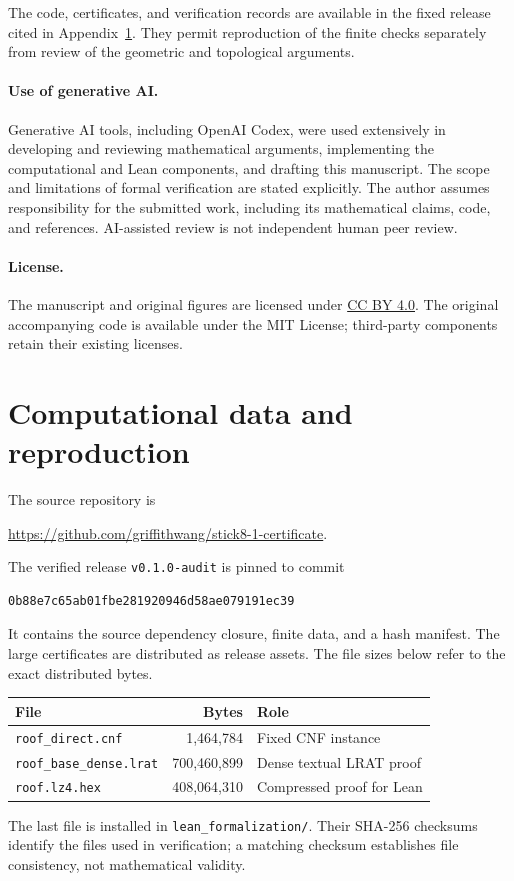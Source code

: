 \documentclass[11pt]{article}
\newcommand{\code}[1]{\nolinkurl{#1}}
\begin{document}
The code, certificates, and verification records are available in the
fixed release cited in Appendix~\ref{app:reproduction}. They permit
reproduction of the finite checks separately from review of the
geometric and topological arguments.

\paragraph{Use of generative AI.}
Generative AI tools, including OpenAI Codex, were used extensively in
developing and reviewing mathematical arguments, implementing the
computational and Lean components, and drafting this manuscript.
The scope and limitations of formal verification are stated explicitly.
The author assumes responsibility for the submitted work, including its
mathematical claims, code, and references. AI-assisted review is not
independent human peer review.

\paragraph{License.}
The manuscript and original figures are licensed under
\href{https://creativecommons.org/licenses/by/4.0/}{CC BY 4.0}.
The original accompanying code is available under the MIT License;
third-party components retain their existing licenses.

\appendix
\section{Computational data and reproduction}\label{app:reproduction}
The source repository is
\begin{center}\small
\url{https://github.com/griffithwang/stick8-1-certificate}.
\end{center}
The verified release \code{v0.1.0-audit} is pinned to commit
\begin{verbatim}
0b88e7c65ab01fbe281920946d58ae079191ec39
\end{verbatim}
It contains the source dependency closure, finite data, and a hash
manifest. The large certificates are distributed as release assets.
The file sizes below refer to the exact distributed bytes.

\begin{center}\small
\begin{tabular}{lrl}
\toprule
File & Bytes & Role\\
\midrule
\code{roof_direct.cnf} & 1,464,784 & Fixed CNF instance\\
\code{roof_base_dense.lrat} & 700,460,899 & Dense textual LRAT proof\\
\code{roof.lz4.hex} & 408,064,310 & Compressed proof for Lean\\
\bottomrule
\end{tabular}
\end{center}
The last file is installed in \code{lean_formalization/}.
Their SHA-256 checksums identify the files used in verification; a
matching checksum establishes file consistency, not mathematical validity.
\end{document}
